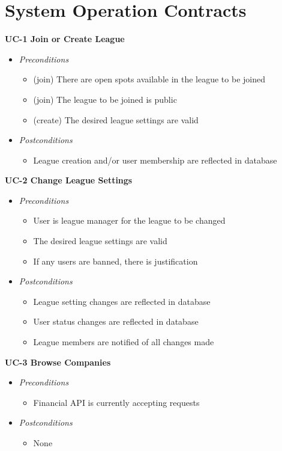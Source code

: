 \section{System Operation Contracts}



\textbf{UC-1 Join or Create League}
\begin{itemize}
	\item \emph{Preconditions}
		\begin{itemize}
		\item (join) There are open spots available in the league to be joined
		\item (join) The league to be joined is public
		\item (create) The desired league settings are valid
		\end{itemize}
	\item \emph{Postconditions}
		\begin{itemize}
		\item League creation and/or user membership are reflected in database
		\end{itemize}
\end{itemize}
\textbf{UC-2 Change League Settings}
\begin{itemize}
	\item \emph{Preconditions}
		\begin{itemize}
		\item User is league manager for the league to be changed
		\item The desired league settings are valid
		\item If any users are banned, there is justification
		\end{itemize}
	\item \emph{Postconditions}
		\begin{itemize}
		\item League setting changes are reflected in database
		\item User status changes are reflected in database
		\item League members are notified of all changes made
		\end{itemize}
\end{itemize}
\textbf{UC-3 Browse Companies}
\begin{itemize}
	\item \emph{Preconditions}
		\begin{itemize}
		\item Financial API is currently accepting requests
		\end{itemize}
	\item \emph{Postconditions}
		\begin{itemize}
		\item None
		\end{itemize}
\end{itemize}
